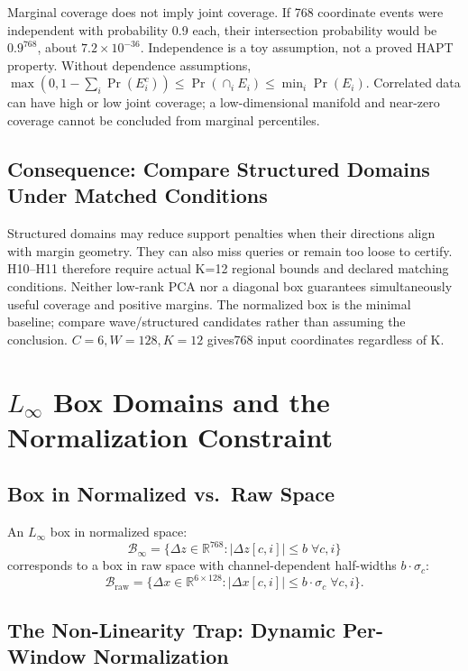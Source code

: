 \documentclass[11pt, a4paper]{article}
\theoremstyle{definition}
\theoremstyle{plain}
\newcommand{\R}{\mathbb{R}}
\begin{document}
Marginal coverage does not imply joint coverage. If 768 coordinate events
were independent with probability 0.9 each, their intersection probability
would be $0.9^{768}$, about $7.2\times10^{-36}$. Independence is a toy
assumption, not a proved HAPT property. Without dependence assumptions,
$\max(0,1-\sum_i\Pr(E_i^c))\le\Pr(\cap_iE_i)\le\min_i\Pr(E_i)$.
Correlated data can have high or low joint coverage; a low-dimensional
manifold and near-zero coverage cannot be concluded from marginal percentiles.

\subsection{Consequence: Compare Structured Domains Under Matched Conditions}
Structured domains may reduce support penalties when their directions align
with margin geometry. They can also miss queries or remain too loose to
certify. H10--H11 therefore require actual K=12 regional bounds and declared
matching conditions. Neither low-rank PCA nor a diagonal box guarantees
simultaneously useful coverage and positive margins. The normalized box is
the minimal baseline; compare wave/structured candidates rather than assuming
the conclusion. $C=6,W=128,K=12$ gives768 input coordinates regardless of K.

\section{$L_\infty$ Box Domains and the Normalization Constraint}

\subsection{Box in Normalized vs.\ Raw Space}

An $L_\infty$ box in normalized space:
\[
  \mathcal{B}_\infty = \bigl\{ \Delta z \in \R^{768} : |\Delta z[c,i]| \le b \;\forall c, i \bigr\}
\]
corresponds to a box in raw space with channel-dependent half-widths $b \cdot \sigma_c$:
\[
  \mathcal{B}_{\text{raw}} = \bigl\{ \Delta x \in \R^{6 \times 128} : |\Delta x[c,i]| \le b \cdot \sigma_c \;\forall c, i \bigr\}.
\]

\subsection{The Non-Linearity Trap: Dynamic Per-Window Normalization}
\end{document}
